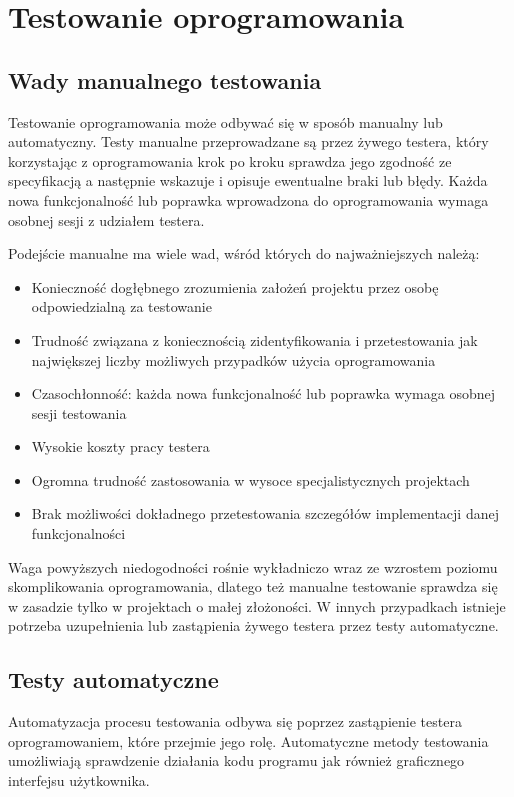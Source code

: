 	\section{Testowanie oprogramowania}
	  \subsection{Wady manualnego testowania}
  	  Testowanie oprogramowania może odbywać się w sposób manualny lub automatyczny. Testy manualne przeprowadzane są przez żywego testera, który korzystając z oprogramowania krok po kroku sprawdza jego zgodność ze specyfikacją a następnie wskazuje i opisuje ewentualne braki lub błędy. Każda nowa funkcjonalność lub poprawka wprowadzona do oprogramowania wymaga osobnej sesji z udziałem testera. 
	  
  	  Podejście manualne ma wiele wad, wśród których do najważniejszych należą:
	  
  	  \begin{itemize}
  	    \item Konieczność dogłębnego zrozumienia założeń projektu przez osobę odpowiedzialną za testowanie
  	    \item Trudność związana z koniecznością zidentyfikowania i przetestowania jak największej liczby możliwych przypadków użycia oprogramowania
  	    \item Czasochłonność: każda nowa funkcjonalność lub poprawka wymaga osobnej sesji testowania
  	   	\item Wysokie koszty pracy testera
  	   	\item Ogromna trudność zastosowania w wysoce specjalistycznych projektach
  	   	\item Brak możliwości dokładnego przetestowania szczegółów implementacji danej funkcjonalności
  	  \end{itemize}
	  
  	  Waga powyższych niedogodności rośnie wykładniczo wraz ze wzrostem poziomu skomplikowania oprogramowania, dlatego też manualne testowanie sprawdza się w zasadzie tylko w projektach o małej złożoności. W innych przypadkach istnieje potrzeba uzupełnienia lub zastąpienia żywego testera przez testy automatyczne.
	  
	  \subsection{Testy automatyczne}
	    Automatyzacja procesu testowania odbywa się poprzez zastąpienie testera oprogramowaniem, które przejmie jego rolę. Automatyczne metody testowania umożliwiają sprawdzenie działania kodu programu jak również graficznego interfejsu użytkownika.
